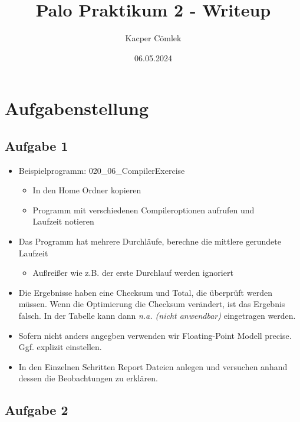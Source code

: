 \documentclass{article}
\author{Kacper Cömlek}
\title{Palo Praktikum 2 - Writeup}
\date{06.05.2024}
\begin{document}
\maketitle
\tableofcontents 


\section{Aufgabenstellung}

  \subsection{Aufgabe 1}
  
  \begin{itemize}
  
  \item Beispielprogramm: 020\_06\_CompilerExercise
  
  \begin{itemize}
  \item In den Home Ordner kopieren
  \item Programm mit verschiedenen Compileroptionen aufrufen und \\Laufzeit notieren
  \end{itemize}

  \item Das Programm hat mehrere Durchläufe, berechne die mittlere gerundete Laufzeit
  
  \begin{itemize}
  \item Außreißer wie z.B. der erste Durchlauf werden ignoriert
  \end{itemize}

  \item Die Ergebnisse haben eine Checksum und Total, die überprüft werden müssen. 
    Wenn die Optimierung die Checksum verändert, ist das Ergebnis falsch. 
    In der Tabelle kann dann \emph{n.a. (nicht anwendbar)} eingetragen werden.

  \item Sofern nicht anders angegben verwenden wir Floating-Point Modell precise. 
    Ggf. explizit einstellen. 
  
  \item In den Einzelnen Schritten Report Dateien anlegen und versuchen anhand 
    dessen die Beobachtungen zu erklären. 
  \end{itemize}

  \subsection{Aufgabe 2}
\end{document}
